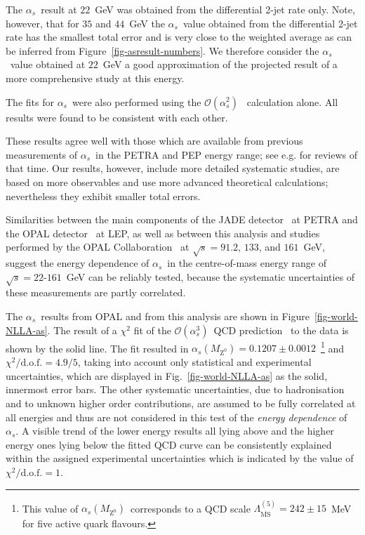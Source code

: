 \documentclass[12pt,a4paper,twoside]{article}
\newcommand{\lmsbf}  {\ensuremath{\Lambda^{(5)}_{\mathrm{\overline{MS}}}}}
\newcommand{\as}     {\ensuremath{\alpha_s}}
\newcommand{\asmz}   {\ensuremath{\alpha_s(M_{\mathrm{Z^0}})}}
\newcommand{\oaa}    {\ensuremath{\mathcal{O}(\alpha_s^2)}}
\newcommand{\oaaa}   {\ensuremath{\mathcal{O}(\alpha_s^3)}}
\newcommand{\chisq}  {\ensuremath{\chi^2}}
\newcommand{\chisqd} {\ensuremath{\chi^2/\mathrm{d.o.f.}}}
\begin{document}
The \as\ result at $22$~GeV was obtained from the differential 2-jet 
rate only.
Note, however, that for $35$ and $44$~GeV the 
\as\ value obtained from the differential 2-jet rate 
has the smallest total error and %
is very close to 
the weighted average as can be inferred from Figure~\ref{fig-asresult-numbers}. 
We therefore consider the \as\ value 
obtained   
at $22$~GeV 
a good 
approximation of the projected result of a more    
comprehensive study at this energy.                

The fits for \as\ were also performed using the \oaa\ %
calculation alone. 
All results were found to be consistent with each other. 

These results agree well with those which are available from previous
measurements of \as\ in the PETRA and PEP energy range; see e.g.
\cite{bib-naroska,bib-sb-budapest} for reviews of that time.
Our results, however, include more detailed systematic studies, are
based on more observables and use more advanced theoretical calculations;
nevertheless they exhibit 
smaller total errors. 

Similarities between the main components of the JADE
detector~\cite{bib-JADEdet}
at PETRA and the OPAL detector~\cite{bib-OPALdetector} at LEP, as well as
between this analysis and studies performed by the OPAL
Collaboration~\cite{bib-eventshapes,bib-OPALresummed,bib-OPALNLLA} 
at $\sqrt{s} = 91.2$,
$133$, and $161$~GeV, suggest the energy dependence of 
\as\ in the centre-of-mass energy range of $\sqrt{s} = 22$-$161$~GeV
can be reliably tested, 
because the systematic uncertainties of these measurements are 
partly correlated. 

The \as\ results from OPAL and from this analysis are shown in 
Figure~\ref{fig-world-NLLA-as}. 
The result of 
a $\chisq$ fit of the \oaaa\ QCD prediction~\cite{bib-PDG} 
to the data is shown by the 
solid line. The fit resulted 
in $\asmz = 0.1207 \pm 0.0012$~\footnote{This value of \asmz\ corresponds 
to a QCD scale $\lmsbf = 242 \pm 15$~MeV for five active quark flavours.}
and $\chisqd = 4.9/5$,
taking into account only statistical and experimental uncertainties, which
are displayed in Fig.~\ref{fig-world-NLLA-as} as the solid, innermost error
bars.
The other systematic uncertainties, due to hadronisation and to unknown
higher order contributions, are assumed to be fully correlated at all
energies and thus are not considered in this test of the {\em energy
dependence} of \as.
A visible trend of the lower energy results all lying above and
the higher energy ones lying below the fitted QCD curve can be consistently
explained within the assigned experimental uncertainties which is indicated
by the value of $\chisqd = 1$.
\end{document}
